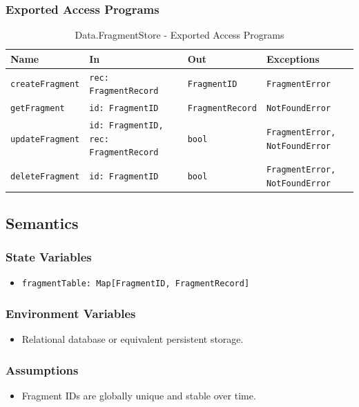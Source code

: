 \documentclass[12pt, titlepage]{article}
\begin{document}
\subsubsection{Exported Access Programs}

\begin{table}[H]
\centering
\small
\caption{Data.FragmentStore - Exported Access Programs}
\begin{tabular}{p{3.2cm} p{3.8cm} p{3cm} p{4cm}}
\toprule
\textbf{Name} & \textbf{In} & \textbf{Out} & \textbf{Exceptions} \\
\midrule
\texttt{createFragment} & \texttt{rec: FragmentRecord} & \texttt{FragmentID} & \texttt{FragmentError} \\
\texttt{getFragment} & \texttt{id: FragmentID} & \texttt{FragmentRecord} & \texttt{NotFoundError} \\
\texttt{updateFragment} & \texttt{id: FragmentID, rec: FragmentRecord} & \texttt{bool} & \texttt{FragmentError, NotFoundError} \\
\texttt{deleteFragment} & \texttt{id: FragmentID} & \texttt{bool} & \texttt{FragmentError, NotFoundError} \\
\bottomrule
\end{tabular}
\end{table}

\subsection{Semantics}

\subsubsection{State Variables}
\begin{itemize}
    \item \texttt{fragmentTable: Map[FragmentID, FragmentRecord]}
\end{itemize}

\subsubsection{Environment Variables}
\begin{itemize}
    \item Relational database or equivalent persistent storage.
\end{itemize}

\subsubsection{Assumptions}
\begin{itemize}
    \item Fragment IDs are globally unique and stable over time.
\end{itemize}
\end{document}
